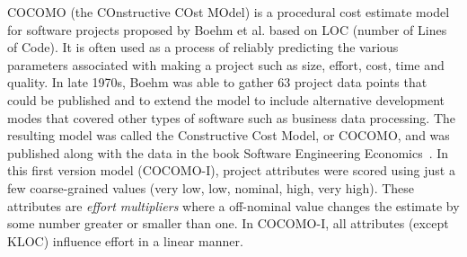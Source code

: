 \documentclass[sigconf,review,anonymous]{acmart}
\begin{document}
COCOMO (the COnstructive COst MOdel) is a procedural cost estimate model for software projects proposed by Boehm et al. based on LOC (number of Lines of Code). It is often used as a process of reliably predicting the various parameters associated with making a project such as size, effort, cost, time and quality. In late 1970s, Boehm was able to gather 63 project data points that could be published and to extend the model to
include alternative development modes that covered
other types of software such as business data
processing.  The resulting model was called the
Constructive Cost Model, or COCOMO, and was
published along with the data in the book Software
Engineering Economics~\cite{boehm1981software}. 
In this first version model (COCOMO-I), project attributes
were scored using just a few coarse-grained values (very low,
low, nominal, high, very high). These attributes
are {\em effort multipliers} where
a off-nominal value changes the estimate by some number
greater or smaller than one.
In COCOMO-I, all attributes (except KLOC)
influence effort in a linear manner.



\end{document}

